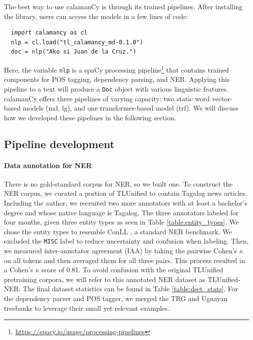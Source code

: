 \documentclass[11pt]{article}
\begin{document}
The best way to use calamanCy is through its trained pipelines.
After installing the library, users can access the models in a few lines of code:

\begin{verbatim}
  import calamancy as cl
  nlp = cl.load("tl_calamancy_md-0.1.0")
  doc = nlp("Ako si Juan de la Cruz.")
\end{verbatim}

Here, the variable \texttt{nlp} is a spaCy processing pipeline\footnote[2]{\url{https://spacy.io/usage/processing-pipelines}} that contains trained components for POS tagging, dependency parsing, and NER.
Applying this pipeline to a text will produce a \texttt{Doc} object with various linguistic features. 
calamanCy offers three pipelines of varying capacity: two static word vector-based models (md, lg), and one transformer-based model (trf).
We will discuss how we developed these pipelines in the following section.

\subsection{Pipeline development}

\paragraph*{Data annotation for NER}
There is no gold-standard corpus for NER, so we built one. 
To construct the NER corpus, we curated a portion of TLUnified \citep{Cruz2021ImprovingLL} to contain Tagalog news articles.
Including the author, we recruited two more annotators with at least a bachelor's degree and whose native language is Tagalog.
The three annotators labeled for four months, given three entity types as seen in Table \ref{table:entity_types}.
We chose the entity types to resemble ConLL \citep{Sang2002IntroductionTT,Sang2003IntroductionTT}, a standard NER benchmark.
We excluded the \texttt{MISC} label to reduce uncertainty and confusion when labeling.
Then, we measured inter-annotator agreement (IAA) by taking the pairwise Cohen's $\kappa$ on all tokens and then averaged them for all three pairs.
This process resulted in a Cohen's $\kappa$ score of 0.81. 
To avoid confusion with the original TLUnified pretraining corpora, we will refer to this annotated NER dataset as TLUnified-NER.
The final dataset statistics can be found in Table \ref{table:dset_stats}.
For the dependency parser and POS tagger, we merged the TRG \citep{Samson2018TRG} and Ugnayan \citep{Aquino2020ParsingIT} treebanks to leverage their small yet relevant examples.
\end{document}
